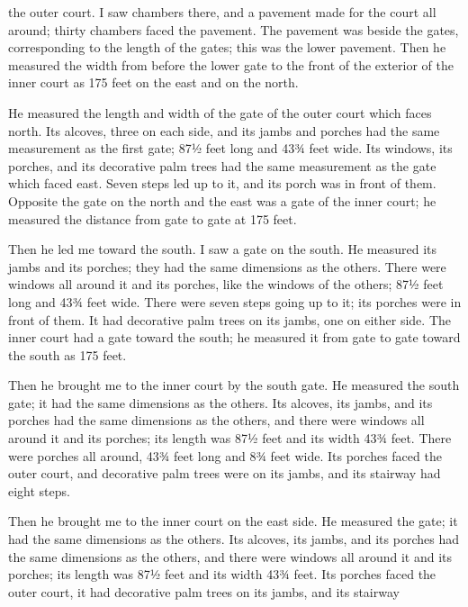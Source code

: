 {the outer
court.
I saw
chambers
there, and a pavement
made
for the court
all
around;
thirty
chambers
faced the pavement.
The pavement
was beside
the gates,
corresponding
to the length
of the gates;
this was the lower
pavement.
Then he measured
the width
from before
the lower
gate
to the front
of the exterior
of the inner
court
as
175 feet
on the east
and on the north.
\par }{\PP {}He measured
the length
and width
of the gate
of the outer
court
which
faces
north.
Its alcoves,
three
on each side,
and its jambs
and porches
had the same measurement
as the first
gate;
87½ feet
long
and 43¾ feet
wide.
Its windows,
its porches,
and its decorative palm trees
had the same measurement
as the gate
which
faced
east.
Seven
steps
led up
to it, and its porch
was in front of them.
Opposite
the gate
on the north
and the east
was a gate
of the inner
court;
he measured
the distance from gate
to
gate
at 175 feet.
\par }{\PP {}Then
he led
me toward
the south.
I saw
a gate
on
the south.
He measured
its jambs
and its porches;
they had the same dimensions
as the others.
There were windows
all around
it and its porches,
like the windows
of the others;
87½ feet
long
and 43¾ feet
wide.
There were seven
steps
going up
to it; its porches
were in front
of them. It had decorative palm trees
on its jambs,
one
on
either side.
The inner
court
had a gate
toward
the south;
he measured
it from gate
to
gate
toward
the south
as 175 feet.
\par }{\PP {}Then he brought
me to
the inner
court
by the south
gate.
He measured
the south
gate;
it had the same dimensions
as the others.
Its alcoves,
its jambs,
and its porches
had the same dimensions
as the others, and there were windows
all
around
it and its porches;
its length
was 87½ feet
and its width
43¾
feet.
There were porches
all
around,
43¾ feet
long
and 8¾ feet
wide.
Its porches
faced
the outer
court,
and decorative palm trees
were on
its jambs,
and its stairway
had eight
steps.
\par }{\PP {}Then he brought
me to
the inner
court
on
the east side.
He measured
the gate;
it had the same dimensions
as the others.
Its alcoves,
its jambs,
and its porches
had the same dimensions
as the others, and there were windows
all
around
it and its porches;
its length
was 87½ feet
and its width
43¾
feet.
Its porches
faced the outer
court,
it had decorative palm trees
on
its jambs,
and its stairway
}

